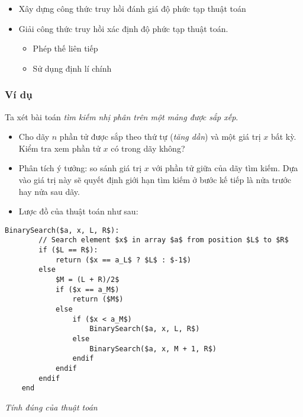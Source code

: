 \begin{itemize}
    \item Xây dựng công thức truy hồi đánh giá độ phức tạp thuật toán
    \item Giải công thức truy hồi xác định độ phức tạp thuật toán.
        \begin{itemize}
            \item Phép thế liên tiếp
            \item Sử dụng định lí chính
        \end{itemize}
\end{itemize}


\subsubsection{Ví dụ}
Ta xét bài toán \textit{tìm kiếm nhị phân trên một mảng được sắp xếp}.

\begin{itemize}
    \item Cho dãy $n$ phần tử được sắp theo thứ tự (\textit{tăng dần}) và một giá trị $x$ 
    bất kỳ. Kiểm tra xem phần tử  $x$ có trong dãy không?

    \item Phân tích ý tưởng: so sánh giá trị $x$ với phần tử giữa của dãy tìm kiếm. Dựa
    vào giá trị này sẽ quyết định giới hạn tìm kiếm ở bước kế tiếp là nửa trước
    hay nửa sau dãy.

    \item Lược đồ của thuật toán như sau:

\end{itemize}

\begin{lstlisting}[style=algo]
    BinarySearch($a, x, L, R$):
        // Search element $x$ in array $a$ from position $L$ to $R$
        if ($L == R$):
            return ($x == a_L$ ? $L$ : $-1$)
        else
            $M = (L + R)/2$
            if ($x == a_M$) 
                return ($M$)
            else
                if ($x < a_M$)
                    BinarySearch($a, x, L, R$)
                else 
                    BinarySearch($a, x, M + 1, R$)
                endif
            endif
        endif
    end
\end{lstlisting}

\textit{Tính đúng của thuật toán}

